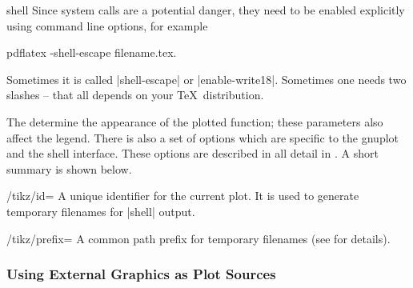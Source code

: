 {\begin{addplotoperation}[]{shell}{}
Since system calls are a potential danger, they need to be enabled explicitly using command line options, for example
\begin{codeexample}
pdflatex -shell-escape filename.tex.
\end{codeexample}
Sometimes it is called |shell-escape| or |enable-write18|. Sometimes one needs two slashes -- that all depends on your \TeX\ distribution.
\begin{codeexample}[]
\end{codeexample}

\begin{codeexample}[]
\end{codeexample}

The  determine the appearance of the plotted function; these parameters also affect the legend. There is also a set of options which are specific to the gnuplot and the shell interface. These options are described in all detail in \cite[section~19.6]{tikz}. A short summary is shown below.
\end{addplotoperation}

\begin{key}{/tikz/id=}
	 A unique identifier for the current plot. It is used to generate temporary filenames for |shell| output.
\end{key}

\begin{key}{/tikz/prefix=}
	 A common path prefix for temporary filenames (see \cite[section~19.6]{tikz} for details).
\end{key}

\subsubsection{Using External Graphics as Plot Sources}
{

}}
